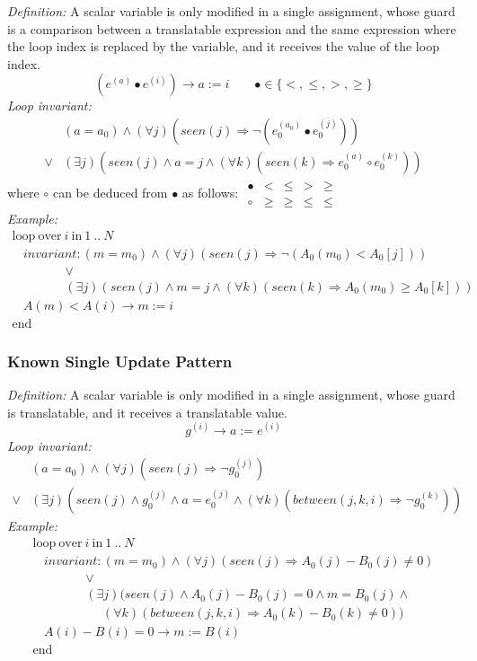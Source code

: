 \documentclass[a4paper,10pt]{article}
\newcommand{\idx}{\ensuremath{i}\xspace}
\newcommand{\at}[1]{{(#1)}}
\newcommand{\KWloop}{\ensuremath{\mathrm{loop}~}}
\newcommand{\KWend}{\ensuremath{\mathrm{end}~}}
\newcommand{\KWover}{\ensuremath{\mathrm{over}~}}
\newcommand{\KWin}{\ensuremath{~\mathrm{in}~}}
\newcommand{\impl}{\ensuremath{\Longrightarrow}}
\newcommand{\seen}[1]{\ensuremath{\mathit{seen}(#1)}\xspace}
\newcommand{\between}[3]{\ensuremath{\mathit{between}{(#1,#2,#3)}}\xspace}
\newcommand{\loopinvariant}{\noindent\textit{Loop invariant:}\xspace}
\newcommand{\patterndef}{\noindent\textit{Definition:}\xspace}
\newcommand{\patternexample}{\noindent\textit{Example:}\xspace}
\begin{document}
\patterndef A scalar variable is only modified in a single assignment, whose
guard is a comparison between a translatable expression and the same expression
where the loop index is replaced by the variable, and it receives the value of
the loop index.
%
$$(e^\at{a} \bullet e^\at{\idx}) \rightarrow a := \idx  \qquad \bullet \in \{<, \leq, >, \geq \}$$
%
\loopinvariant
%
\begin{eqnarray*}
&(a = a_0) \land (\forall j)(\seen{j} \impl \neg (e_0^\at{a_0} \bullet e_0^\at{j}))\\
\lor 
& (\exists j)(\seen{j} \land a = j \land (\forall k)(\seen{k} \impl e_0^\at{a} \circ e_0^\at{k}))
\end{eqnarray*}
where $\circ$ can be deduced from $\bullet$ as follows:
$\begin{array}{l|llll}
\bullet & <    & \leq & >    & \geq \\ \hline
\circ   & \geq & \geq & \leq & \leq
\end{array}$\\
%
\patternexample
$$\begin{array}{l}
  \KWloop \KWover i \KWin 1~..~N \\
  ~~~~ \textit{invariant}: (m = m_0) \land (\forall j)(\seen{j} \impl \neg (A_0(m_0) < A_0[j]))\\
  ~~~~~~~~~~~~~~~~~~~ \lor \\ 
  ~~~~~~~~~~~~~~~~~~~ (\exists j)(\seen{j} \land m = j \land (\forall k)(\seen{k} \impl A_0(m_0) \geq A_0[k]))\\
  ~~~~ A(m) < A(i) \rightarrow m := i\\
  \KWend
\end{array}$$

\subsubsection*{Known Single Update Pattern}

\patterndef A scalar variable is only modified in a single assignment, whose
guard is translatable, and it receives a translatable value.
%
$$g^\at{\idx} \rightarrow a := e^\at{\idx}$$
%
\loopinvariant
%
\begin{eqnarray*}
&(a = a_0) \land (\forall j)(\seen{j} \impl \neg g_0^\at{j})\\
\lor 
& (\exists j)(\seen{j} \land g_0^\at{j} \land a = e_0^\at{j} \land (\forall k)(\between{j}{k}{\idx} \impl \neg g_0^\at{k}))
\end{eqnarray*}
%
\patternexample
$$\begin{array}{l}
  \KWloop \KWover i \KWin 1~..~N \\
  ~~~~ \textit{invariant}: (m = m_0) \land (\forall j)(\seen{j} \impl A_0(j)-B_0(j)\neq0)\\
  ~~~~~~~~~~~~~~~~~~~ \lor \\ 
  ~~~~~~~~~~~~~~~~~~~ (\exists j)(\seen{j} \land A_0(j)-B_0(j)= 0 \land m = B_0(j) \land \\
  ~~~~~~~~~~~~~~~~~~~~~~~~~ (\forall k)(\between{j}{k}{\idx} \impl A_0(k)-B_0(k)\neq0))\\
  ~~~~ A(i)-B(i)=0 \rightarrow m := B(i)\\
  \KWend
\end{array}$$
\end{document}

